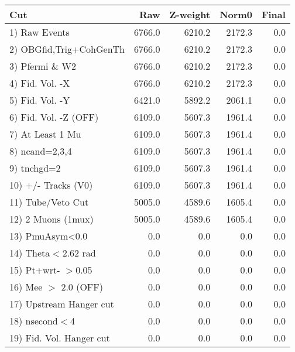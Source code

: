  \begin{table}[h!]\centering
 \begin{tabular}{||l||r|r|r|r||}
 \hline
 \hline
 Cut & Raw & Z-weight & Norm0 & Final \\
 \hline
  1) Raw Events           &      6766.0 &      6210.2 &      2172.3 &         0.0 \\
  2) OBGfid,Trig+CohGenTh &      6766.0 &      6210.2 &      2172.3 &         0.0 \\
  3) Pfermi \& W2         &      6766.0 &      6210.2 &      2172.3 &         0.0 \\
  4) Fid. Vol. -X         &      6766.0 &      6210.2 &      2172.3 &         0.0 \\
  5) Fid. Vol. -Y         &      6421.0 &      5892.2 &      2061.1 &         0.0 \\
  6) Fid. Vol. -Z (OFF)   &      6109.0 &      5607.3 &      1961.4 &         0.0 \\
  7) At Least 1 Mu        &      6109.0 &      5607.3 &      1961.4 &         0.0 \\
  8) ncand=2,3,4          &      6109.0 &      5607.3 &      1961.4 &         0.0 \\
  9) tnchgd=2             &      6109.0 &      5607.3 &      1961.4 &         0.0 \\
 10) +/- Tracks (V0)      &      6109.0 &      5607.3 &      1961.4 &         0.0 \\
 11) Tube/Veto Cut        &      5005.0 &      4589.6 &      1605.4 &         0.0 \\
 12) 2 Muons (1mux)       &      5005.0 &      4589.6 &      1605.4 &         0.0 \\
 13) PmuAsym<0.0          &         0.0 &         0.0 &         0.0 &         0.0 \\
 14) Theta$<$2.62 rad     &         0.0 &         0.0 &         0.0 &         0.0 \\
 15) Pt+wrt- $>$0.05      &         0.0 &         0.0 &         0.0 &         0.0 \\
 16) Mee $>$ 2.0  (OFF)   &         0.0 &         0.0 &         0.0 &         0.0 \\
 17) Upstream Hanger cut  &         0.0 &         0.0 &         0.0 &         0.0 \\
 18) nsecond$<$4          &         0.0 &         0.0 &         0.0 &         0.0 \\
 19) Fid. Vol. Hanger cut &         0.0 &         0.0 &         0.0 &         0.0 \\

\end{tabular}
\end{table}
